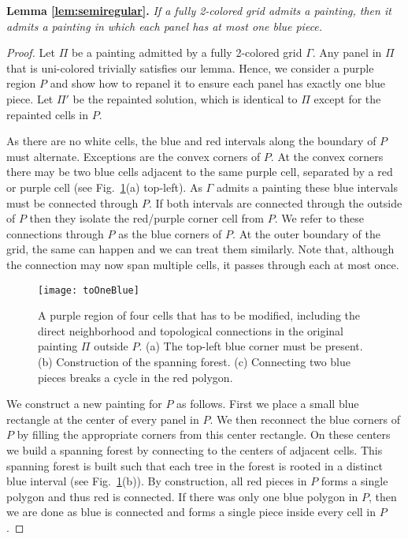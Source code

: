 \documentclass[runningheads]{llncs}
\newcommand{\cloneclaim}[2]{\medskip\noindent\textbf{#1.} \emph{#2}\smallskip}
\begin{document}
\cloneclaim{Lemma \ref{lem:semiregular}}{If a fully 2-colored grid admits a painting, then it admits a painting in which each panel has at most one blue piece.}
\begin{proof}
    Let $\Pi$ be a painting admitted by a fully 2-colored grid $\Gamma$.
    Any panel in $\Pi$ that is uni-colored trivially satisfies our lemma.
    Hence, we consider a purple region $P$ and show how to repanel it to ensure each panel has exactly one blue piece.
    Let $\Pi'$ be the repainted solution, which is identical to $\Pi$ except for the repainted cells in $P$.

    As there are no white cells, the blue and red intervals along the boundary of $P$ must alternate.
    Exceptions are the convex corners of $P$.
    At the convex corners there may be two blue cells adjacent to the same purple cell, separated by a red or purple cell (see Fig.~\ref{fig:toOneBlue}(a) top-left).
    As $\Gamma$ admits a painting these blue intervals must be connected through $P$.
    If both intervals are connected through the outside of $P$ then they isolate the red/purple corner cell from $P$.
	We refer to these connections through $P$ as the blue corners of $P$.
	At the outer boundary of the grid, the same can happen and we can treat them similarly. Note that, although the connection may now span multiple cells, it passes through each at most once.

    \begin{figure}
      \centering
      \texttt{[image: toOneBlue]}
      \caption{A purple region of four cells that has to be modified, including the direct neighborhood and topological connections in the original painting $\Pi$ outside $P$. (a) The top-left blue corner must be present. (b) Construction of the spanning forest. (c) Connecting two blue pieces breaks a cycle in the red polygon.}
      \label{fig:toOneBlue}
    \end{figure}

    We construct a new painting for $P$ as follows.
    First we place a small blue rectangle at the center of every panel in $P$.
    We then reconnect the blue corners of $P$ by filling the appropriate corners from this center rectangle.
    On these centers we build a spanning forest by connecting to the centers of adjacent cells.
    This spanning forest is built such that each tree in the forest is rooted in a distinct blue interval (see Fig.~\ref{fig:toOneBlue}(b)).
    By construction, all red pieces in $P$ forms a single polygon and thus red is connected.
    If there was only one blue polygon in $P$, then we are done as blue is connected and forms a single piece inside every cell in $P$.


\end{proof}
\end{document}
